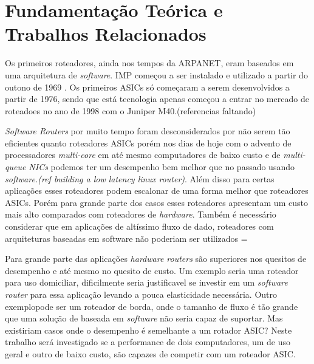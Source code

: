 \section{Fundamentação Teórica e Trabalhos Relacionados}
	Os primeiros roteadores, ainda nos tempos da ARPANET, eram baseados em uma arquitetura de \textit{software}. \ac{IMP} começou a ser instalado e utilizado a partir do outono de 1969 \cite{ARPA}. Os primeiros \acp{ASIC} só começaram a serem desenvolvidos a partir de 1976, sendo que está tecnologia apenas começou a entrar no mercado de roteadoes no ano de 1998 com o Juniper M40.(referencias faltando)

\textit{Software Routers} por muito tempo foram desconsiderados por não serem tão eficientes quanto roteadores ASICs porém nos dias de hoje com o advento de processadores \textit{multi-core} em até mesmo computadores de baixo custo e de \textit{multi-queue NICs} podemos ter um desempenho bem melhor que no passado usando \textit{software.(ref building a low latency linux router)}. Além disso para certas aplicações esses roteadores podem escalonar de uma forma melhor que roteadores ASICs. Porém para grande parte dos casos esses roteadores apresentam um custo mais alto comparados com roteadores de \textit{hardware}. Também é necessário considerar que em aplicações de altíssimo fluxo de dado, roteadores com arquiteturas baseadas em software não poderiam ser utilizados =

Para grande parte das aplicações \textit{hardware routers} são superiores nos quesitos de desempenho e até mesmo no quesito de custo. Um exemplo seria uma roteador para uso domiciliar, dificilmente seria justificavel se investir em um \textit{software router} para essa aplicação levando a pouca elasticidade necessária. Outro exemplopode ser um roteador de borda, onde o tamanho de fluxo é tão grande que uma solução de baseada em \textit{software} não seria capaz de suportar. Mas existiriam casos onde o desempenho é semelhante a um rotador \ac{ASIC}? Neste trabalho será investigado se a performance de dois computadores, um de uso geral e outro de baixo custo, são capazes de competir com um roteador ASIC.
